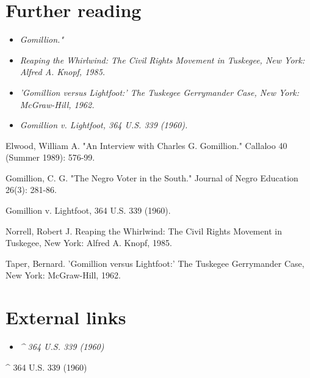 \section{Further reading}\label{further-reading}

\begin{itemize}
\item
  \emph{Gomillion."}
\item
  \emph{Reaping the Whirlwind: The Civil Rights Movement in Tuskegee,
  New York: Alfred A. Knopf, 1985.}
\item
  \emph{'Gomillion versus Lightfoot:' The Tuskegee Gerrymander Case, New
  York: McGraw-Hill, 1962.}
\item
  \emph{Gomillion v. Lightfoot, 364 U.S. 339 (1960).}
\end{itemize}

Elwood, William A. "An Interview with Charles G. Gomillion." Callaloo 40
(Summer 1989): 576-99.

Gomillion, C. G. "The Negro Voter in the South." Journal of Negro
Education 26(3): 281-86.

Gomillion v. Lightfoot, 364 U.S. 339 (1960).

Norrell, Robert J. Reaping the Whirlwind: The Civil Rights Movement in
Tuskegee, New York: Alfred A. Knopf, 1985.

Taper, Bernard. 'Gomillion versus Lightfoot:' The Tuskegee Gerrymander
Case, New York: McGraw-Hill, 1962.

\section{External links}\label{external-links}

\begin{itemize}
\item
  \emph{\^{} 364 U.S. 339 (1960)}
\end{itemize}

\^{} 364 U.S. 339 (1960)
